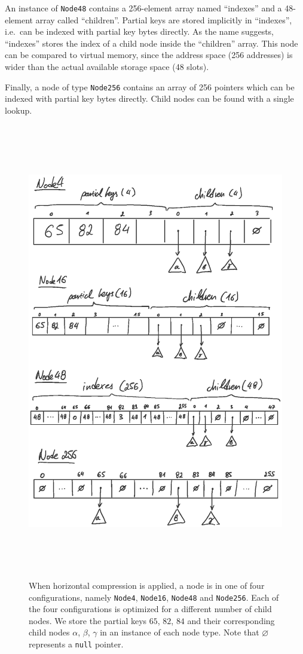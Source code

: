 \documentclass[abstracton,12pt]{scrartcl}
\theoremstyle{definition}
\begin{document}
An instance of \texttt{Node48} contains a 256-element array named 
``indexes'' and a 48-element array called ``children''.
Partial keys are stored implicitly in ``indexes'', i.e.\ 
can be indexed with partial key bytes directly.
As the name suggests, ``indexes'' stores the index of a child
node inside the ``children'' array. This node can be compared to
virtual memory, since the address space (256 addresses) is wider 
than the actual available storage space (48 slots).

Finally, a node of type \texttt{Node256} contains an array of
256 pointers which can be indexed with partial key bytes directly.
Child nodes can be found with a single lookup.

\begin{figure}[h!]
  \centering
  \includegraphics[height=20cm,trim={2.5cm 5cm 2.5cm 3.5cm},clip]{art_nodes_draw}
  \caption{
    When horizontal compression is applied, a node is in one of four 
    configurations, namely \texttt{Node4}, \texttt{Node16}, \texttt{Node48} 
    and \texttt{Node256}.
    Each of the four configurations is optimized for a different number of 
    child nodes. We store the partial keys $65$, $82$, $84$ and their 
    corresponding child nodes $\alpha$, $\beta$, $\gamma$ in an instance
    of each node type. Note that $\varnothing$ represents a \texttt{null} 
    pointer.
  }
 \label{fig:horizontal-compression}
\end{figure}
\end{document}
